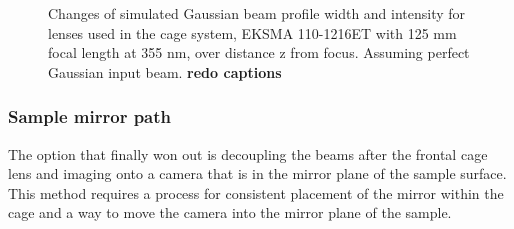 \documentclass[twoside,openright]{scrreprt}
\begin{document}
\begin{figure}[htbp]
\begin{subfigure}[t]{\textwidth}
\end{subfigure}
\caption{Changes of simulated Gaussian beam profile width and intensity for lenses used in the cage system, EKSMA 110-1216ET with 125 mm focal length at 355 nm, over distance z from focus. Assuming perfect Gaussian input beam. \label{fig:beamWaistCompendium}\textbf{redo captions}}
\end{figure}


\subsubsection{Sample mirror path}\label{SampleMirrorCamera}
The option that finally won out is decoupling the beams after the frontal cage lens and imaging onto a camera that is in the mirror plane of the sample surface. This method requires a process for consistent placement of the mirror within the cage and a way to move the camera into the mirror plane of the sample.\\
\end{document}
